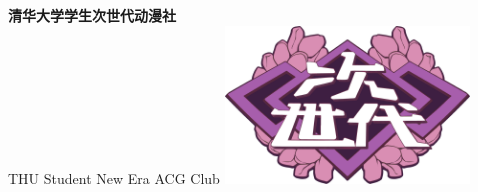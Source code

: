 \documentclass[twoside,12pt]{book}
\begin{document}

\vspace*{0.7cm}



\begin{flushleft}
    \fontsize{30pt}{32pt}\selectfont
    \textbf{\textcolor{truepurple}{清华大学学生次世代动漫社}}
    \\[0ex]
    \fontsize{18pt}{20pt}\selectfont
    \textcolor{thuorange}{THU Student New Era ACG Club}
    \vspace{-1cm} %
    \noindent\hspace*{\dimexpr\textwidth-5cm-1cm}%
    \includegraphics[width=6.5cm]{thujisedai.png}
\end{flushleft}


\vspace{-0.2cm}
\end{document}

